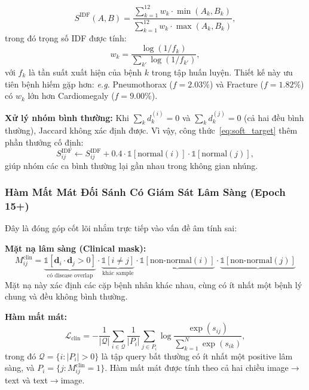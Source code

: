 \documentclass[12pt, a4paper]{article}
\newcommand{\calL}{\mathcal{L}}
\newcommand{\vect}[1]{\mathbf{#1}}
\newcommand{\eg}{\textit{e.g.}}
\begin{document}
\begin{equation}
  \boxed{
  S^\text{IDF}(A, B) =
    \frac{\displaystyle\sum_{k=1}^{12} w_k \cdot \min(A_k, B_k)}
         {\displaystyle\sum_{k=1}^{12} w_k \cdot \max(A_k, B_k)},
  }
  \label{eq:jaccard_idf}
\end{equation}
trong đó trọng số IDF được tính:
\begin{equation}
  w_k = \frac{\log(1/f_k)}{\sum_{k'} \log(1/f_{k'})},
  \label{eq:idf_weight}
\end{equation}
với $f_k$ là tần suất xuất hiện của bệnh $k$ trong tập huấn luyện.
Thiết kế này ưu tiên bệnh hiếm gặp hơn: \eg{} Pneumothorax ($f = 2.03\%$) và
Fracture ($f = 1.82\%$) có $w_k$ lớn hơn Cardiomegaly ($f = 9.00\%$).

\textbf{Xử lý nhóm bình thường:}
Khi $\sum_k d_k^{(i)} = 0$ và $\sum_k d_k^{(j)} = 0$ (cả hai đều bình thường),
Jaccard không xác định được. Vì vậy, công thức~\eqref{eq:soft_target} thêm
phần thưởng cố định:
\begin{equation}
  S^\text{IDF}_{ij} \leftarrow S^\text{IDF}_{ij} + 0.4 \cdot
    \mathbb{1}[\text{normal}(i)] \cdot \mathbb{1}[\text{normal}(j)],
  \label{eq:normal_bonus}
\end{equation}
giúp nhóm các ca bình thường lại gần nhau trong không gian nhúng.

\subsubsection{Hàm Mất Mát Đối Sánh Có Giám Sát Lâm Sàng (Epoch 15+)}
\label{sec:clinical_loss}

Đây là đóng góp cốt lõi nhắm trực tiếp vào vấn đề âm tính sai:

\textbf{Mặt nạ lâm sàng (Clinical mask):}
\begin{equation}
  M^\text{clin}_{ij} =
    \underbrace{\mathbb{1}[\vect{d}_i \cdot \vect{d}_j > 0]}_{\text{có disease overlap}}
    \cdot
    \underbrace{\mathbb{1}[i \neq j]}_{\text{khác sample}}
    \cdot
    \underbrace{\mathbb{1}[\text{non-normal}(i)]}_{}
    \cdot
    \underbrace{\mathbb{1}[\text{non-normal}(j)]}_{}
  \label{eq:clinical_mask}
\end{equation}
Mặt nạ này xác định các cặp bệnh nhân khác nhau, cùng có ít nhất một
bệnh lý chung và đều không bình thường.

\textbf{Hàm mất mát:}
\begin{equation}
  \calL_\text{clin} = -\frac{1}{|\mathcal{Q}|} \sum_{i \in \mathcal{Q}}
    \frac{1}{|P_i|} \sum_{j \in P_i}
    \log \frac{\exp(s_{ij})}{\sum_{k=1}^{N} \exp(s_{ik})},
  \label{eq:clinical_loss}
\end{equation}
trong đó $\mathcal{Q} = \{i : |P_i| > 0\}$ là tập query bất thường có ít nhất
một positive lâm sàng, và $P_i = \{j : M^\text{clin}_{ij} = 1\}$. Hàm mất mát
được tính theo cả hai chiều image$\to$text và text$\to$image.
\end{document}

